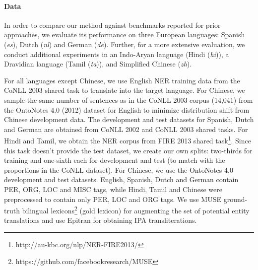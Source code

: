 \documentclass[11pt,a4paper]{article}
\begin{document}
\paragraph{Data}
In order to compare our method against benchmarks reported for prior approaches, 
we evaluate its performance on three European languages: 
Spanish (\textit{es}), Dutch (\textit{nl}) and German (\textit{de}). 
Further, for a more extensive evaluation, 
we conduct additional experiments in
an Indo-Aryan language (Hindi (\textit{hi})),
a Dravidian language (Tamil (\textit{ta})), 
and Simplified Chinese (\textit{zh}).


For all languages except Chinese, 
we use English NER training data 
from the CoNLL 2003 shared task \cite{sang2003introduction} 
to translate into the target language. 
For Chinese, we sample the same number of sentences as
in the CoNLL 2003 corpus (14,041) from the OntoNotes 4.0 (2012) 
dataset for English \cite{weischedel2011ontonotes} to minimize distribution shift from Chinese development data. 
The development and test datasets for Spanish, Dutch and German 
are obtained from CoNLL 2002 \cite{sang2002introduction} 
and CoNLL 2003 shared tasks. 
For Hindi and Tamil, we obtain the NER corpus from FIRE 2013 shared task\footnote{http://au-kbc.org/nlp/NER-FIRE2013/}. 
Since this task doesn't provide the test dataset, 
we create our own splits: two-thirds for training 
and one-sixth each for development 
and test (to match with the proportions in the CoNLL dataset). 
For Chinese, we use the OntoNotes 4.0 development and test datasets. 
English, Spanish, Dutch and German contain PER, ORG, LOC and MISC tags, 
while Hindi, Tamil and Chinese were preprocessed 
to contain only PER, LOC and ORG tags.
We use MUSE ground-truth bilingual lexicons\footnote{https://github.com/facebookresearch/MUSE} (gold lexicon) for augmenting the set of potential entity translations and use Epitran \cite{mortensen2018epitran} for obtaining IPA transliterations.
\end{document}
